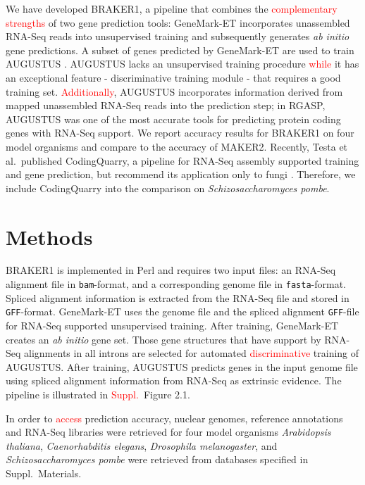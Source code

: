 \documentclass[a4paper,10pt]{article}
\begin{document}
We have developed BRAKER1, a pipeline that combines the \textcolor{red}{complementary strengths} of two gene prediction tools: GeneMark-ET \citep{GeneMark-ET} incorporates unassembled RNA-Seq reads into unsupervised training and subsequently generates \textit{ab initio} gene predictions. A subset of genes predicted by GeneMark-ET are used to train AUGUSTUS \citep{AUGUSTUS}. AUGUSTUS lacks an unsupervised training procedure \textcolor{red}{while} it has an exceptional feature - discriminative training module - that requires a good training set. \textcolor{red}{Additionally}, AUGUSTUS incorporates information derived from mapped unassembled RNA-Seq reads into the prediction step; in RGASP, AUGUSTUS was one of the most accurate tools for predicting protein coding genes with RNA-Seq support. We report accuracy results for BRAKER1 on four model organisms and compare to the accuracy of MAKER2. Recently, Testa et al.~published CodingQuarry, a pipeline for RNA-Seq assembly supported training and gene prediction, but recommend its application only to fungi \citep{CodingQuarry}. Therefore, we 
include CodingQuarry into the comparison on \textit{Schizosaccharomyces pombe}.


\section{Methods}

BRAKER1 is implemented in Perl and requires two input files: an RNA-Seq alignment file in \texttt{bam}-format, and a corresponding genome file in \texttt{fasta}-format. Spliced alignment information is extracted from the RNA-Seq file and stored in \texttt{GFF}-format. GeneMark-ET uses the genome file and  the spliced alignment \texttt{GFF}-file for RNA-Seq supported unsupervised training. After training, GeneMark-ET creates an \textit{ab initio} gene set. Those gene structures that have support by RNA-Seq alignments in all introns are selected for automated \textcolor{red}{discriminative} training of AUGUSTUS. After training, AUGUSTUS predicts genes in the input genome file using spliced alignment information from RNA-Seq as extrinsic evidence. The pipeline is illustrated in \textcolor{red}{Suppl.~}Figure 2.1.




In order to \textcolor{red}{access} prediction accuracy, nuclear genomes, reference annotations and RNA-Seq libraries were retrieved for four model organisms \textit{Arabidopsis thaliana}, \textit{Caenorhabditis elegans}, \textit{Drosophila melanogaster}, and \textit{Schizosaccharomyces pombe} were retrieved from databases specified in Suppl.~Materials.
\end{document}
